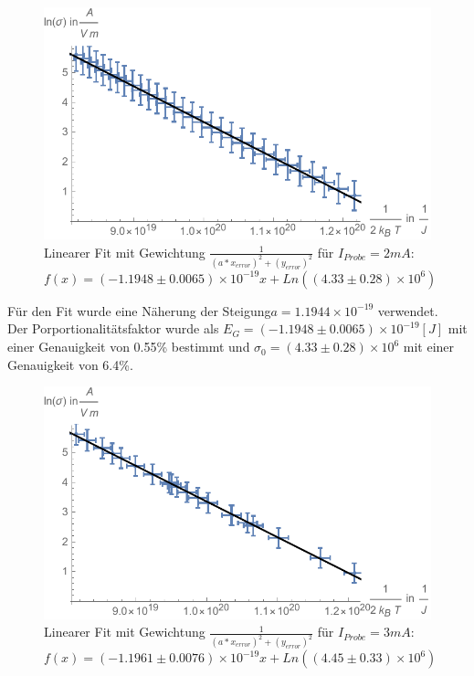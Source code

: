 \begin{figure}[H]
	\centering
	\includegraphics[width=0.9\linewidth]{IMAGE/M1_2mA.pdf}
	\caption{Linearer Fit mit Gewichtung $\frac{1}{(a*x_{error})^2+(y_{error})^2}$ für $I_{Probe}=2mA$:\\ $f(x)=(-1.1948 \pm 0.0065)\times 10^{-19}x + Ln((4.33 \pm 0.28)\times 10^{6})$}
	\label{fig:M1_1}
\end{figure} 

Für den Fit wurde eine Näherung der Steigung$a=1.1944\times 10^{-19}$ verwendet.\\
Der Porportionalitätsfaktor wurde als $E_{G}=(-1.1948 \pm 0.0065)\times 10^{-19} [J]$ mit einer Genauigkeit von 0.55\% bestimmt und $\sigma_{0}=(4.33 \pm 0.28)\times 10^{6}$ mit einer Genauigkeit von 6.4\%.\\

\begin{figure}[H]
	\centering
\includegraphics[width=0.9\linewidth]{IMAGE/M1_3mA.pdf}
	\caption{Linearer Fit mit Gewichtung $\frac{1}{(a*x_{error})^2+(y_{error})^2}$ für $I_{Probe}=3mA$:\\ $f(x)=(-1.1961 \pm 0.0076)\times 10^{-19}x + Ln((4.45 \pm 0.33)\times 10^{6})$}
	\label{fig:M1_2}
\end{figure} 


